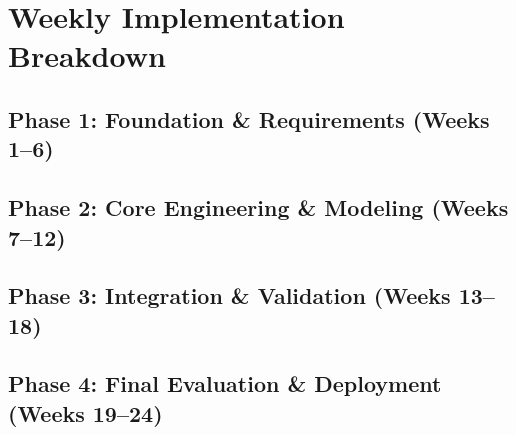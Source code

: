 \chapter{Weekly Implementation Breakdown}
\label{chap:weekly_breakdown}

\section{Phase 1: Foundation \& Requirements (Weeks 1--6)}

\section{Phase 2: Core Engineering \& Modeling (Weeks 7--12)}

\section{Phase 3: Integration \& Validation (Weeks 13--18)}

\section{Phase 4: Final Evaluation \& Deployment (Weeks 19--24)}
